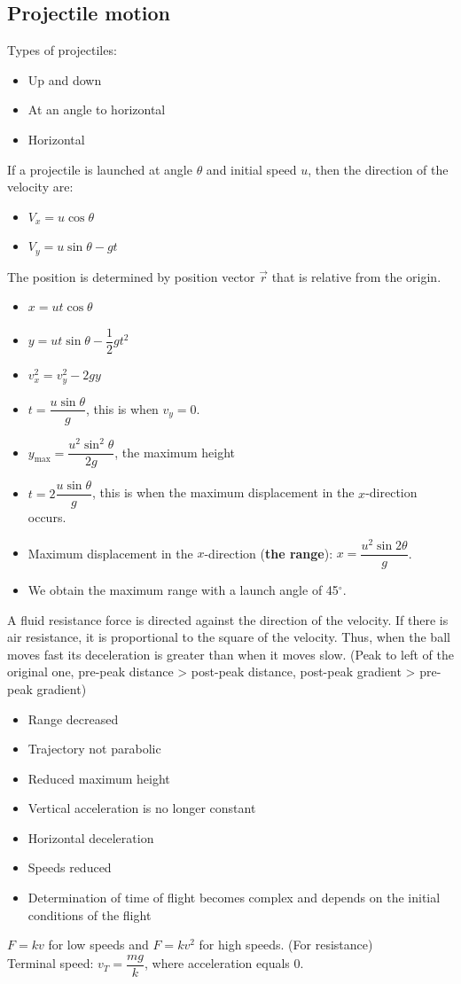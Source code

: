\subsection{Projectile motion}
Types of projectiles:
\begin{itemize}
\item Up and down
\item At an angle to horizontal
\item Horizontal
\end{itemize}
If a projectile is launched at angle $\theta$ and initial speed $u$, then the direction of the velocity are:
\begin{itemize}
  \item $V_x=u\cos\theta$
  \item $V_y=u\sin\theta-gt$
\end{itemize}
The position is determined by position vector $\vec{r}$ that is relative from the origin.
\begin{itemize}
  \item $x=ut\cos\theta$
  \item $y=ut\sin\theta-\dfrac{1}{2}gt^2$
  \item $v_x^2=v_y^2-2gy$
  \item $t=\dfrac{u\sin\theta}{g}$, this is when $v_y=0$.
  \item $y_{\text{max}}=\dfrac{u^2\sin^2\theta}{2g}$, the maximum height
  \item $t=2\dfrac{u\sin\theta}{g}$, this is when the maximum displacement in the $x$-direction occurs.
  \item Maximum displacement in the $x$-direction (\textbf{the range}): $x=\dfrac{u^2\sin 2\theta}{g}$. 
\item We obtain the maximum range with a launch angle of 45$^\circ$.
\end{itemize}
A fluid resistance force is directed against the direction of the velocity. If there is air resistance, it is proportional to the square of the velocity. Thus, when the ball moves fast its deceleration is greater than when it moves slow. (Peak to left of the original one, pre-peak distance > post-peak distance, post-peak gradient > pre-peak gradient)
\begin{itemize}
\item Range decreased
\item Trajectory not parabolic
\item Reduced maximum height
\item Vertical acceleration is no longer constant
\item Horizontal deceleration
\item Speeds reduced
\item Determination of time of flight becomes complex and depends on the initial conditions of the flight
\end{itemize}
$F=kv$ for low speeds and $F=kv^2$ for high speeds. (For resistance)\\
Terminal speed: $v_T=\dfrac{mg}{k}$, where acceleration equals 0.
